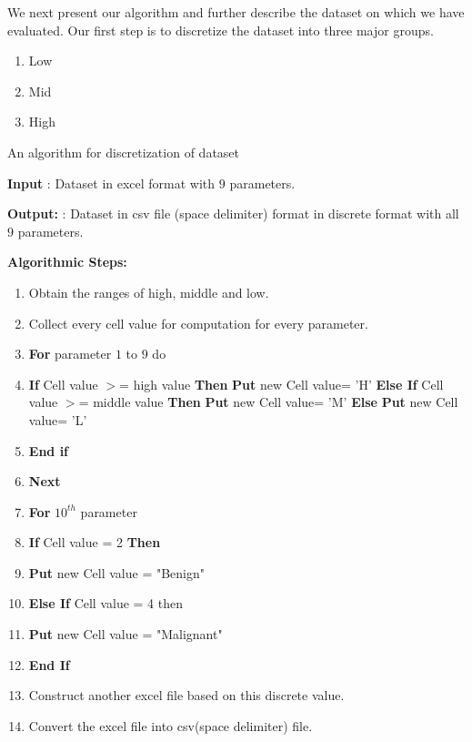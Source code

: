 \documentclass[conference]{IEEEtran}
\begin{document}
We next present our algorithm and further describe the dataset on which we have evaluated. Our first step is to discretize the dataset into three major groups.

\begin{enumerate}
\item Low
\item Mid
\item High
\end{enumerate}

\begin{algorithm}[H]
\caption{An algorithm for discretization  of dataset}


\textbf{Input} : Dataset in excel format with $9$ parameters.

\textbf{Output:} : Dataset in csv file (space delimiter) format in discrete format with all $9$ parameters.

\textbf{Algorithmic Steps:}
\begin{enumerate}
  \item Obtain the ranges of high, middle and low.
  \item Collect every cell value for computation for every parameter.
  \item \textbf{For} parameter $1$ to $9$ do
  \item \textbf{If} Cell value $>$= high value \textbf{Then}
            \textbf{Put} new Cell value= 'H'
            \textbf{Else If} Cell value $>$= middle value \textbf{Then}
             \textbf{Put} new Cell value= 'M'
             \textbf{Else}
             \textbf{Put} new Cell value= 'L'
  \item \textbf{End if}
  \item \textbf{Next}
  \item \textbf{For} $10^{th}$ parameter
  \item \textbf{If} Cell value = 2 \textbf{Then}
  \item \textbf{Put} new Cell value = "Benign"
  \item \textbf{Else If} Cell value = 4 then
  \item \textbf{Put} new Cell value = "Malignant"
  \item \textbf{End If}
  \item Construct another excel file based on this discrete value.
  \item Convert the excel file into csv(space delimiter) file.
\end{enumerate}

\end{algorithm}
\end{document}

